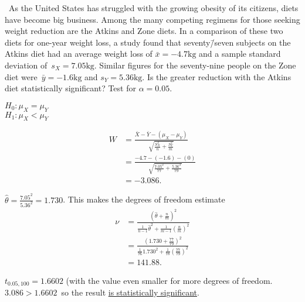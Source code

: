 \begin{problem}
  ~As the United States has struggled with the growing obesity of its citizens, diets have become big business. Among the many competing regimens for those seeking weight reduction are the Atkins and Zone diets. In a comparison of these two diets for one-year weight loss, a study found that seventy\=/seven subjects on the Atkins diet had an average weight loss of ${\bar{x} = -4.7\text{kg}}$ and a sample standard deviation of~${s_X =7.05\text{kg}}$. Similar figures for the seventy-nine people on the Zone diet were~${\bar{y} = -1.6\text{kg}}$ and ${s_Y = 5.36\text{kg}}$. Is the greater reduction with the Atkins diet statistically significant? Test for ${\alpha = 0.05}$.
\end{problem}

\noindent
${H_0: \mu_{X} = \mu_{Y}}$ \\
${H_1: \mu_{X} < \mu_{Y}}$

\begin{align}
  W &= \frac{\bar{X} - \bar{Y} - (\mu_{X} - \mu_{Y})}{\sqrt{\frac{S_{X}^{2}}{n} + \frac{S_{Y}^{2}}{m}}} \\
    &= \frac{-4.7 - (-1.6) - (0)}{\sqrt{\frac{7.05^2}{77}+\frac{5.36^2}{79}}} \\
    &= -3.086\text{.}
\end{align}

${\hat{\theta} = \frac{7.05^2}{5.36^2} = 1.730}$.  This makes the degrees of freedom estimate
\begin{align}
  \nu &= \frac{(\hat{\theta} + \frac{n}{m})^2}{\frac{1}{n-1}\hat{\theta}^2 + \frac{1}{m-1}\left(\frac{n}{m}\right)^2} \\
      &= \frac{\left(1.730 + \frac{77}{79}\right)^2}{\frac{1}{76} 1.730^2 + \frac{1}{78}\left(\frac{77}{79}\right)^2} \\
      &= 141.88 \text{.}
\end{align}

${t_{0.05,100} = 1.6602}$ (with the value even smaller for more degrees of freedom.  ${3.086 > 1.6602}$~so  the result \underline{is statistically significant}.
